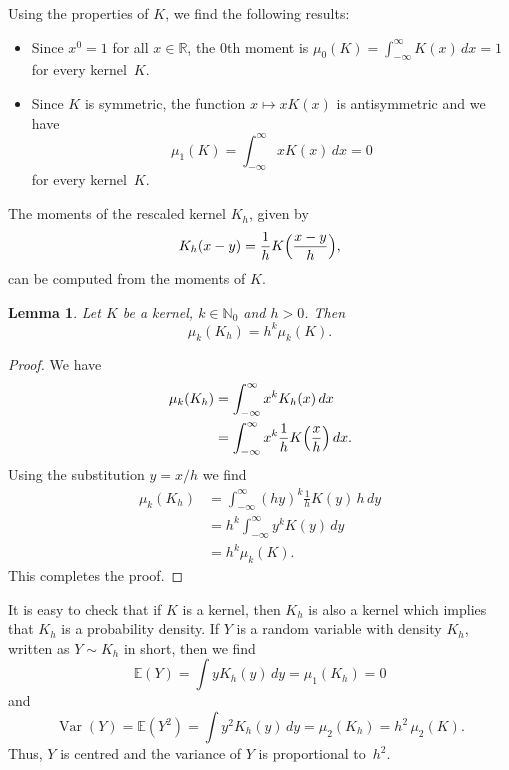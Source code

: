 \documentclass[
  a4paper,
]{article}
\newtheorem{lemma}{Lemma}[section]
\theoremstyle{definition}
\theoremstyle{definition}
\theoremstyle{definition}
\theoremstyle{definition}
\theoremstyle{remark}
\begin{document}
Using the properties of \(K\), we find the following results:

\begin{itemize}
\item
  Since \(x^0 = 1\) for all \(x\in\mathbb{R}\),
  the \(0\)th moment is \(\mu_0(K) = \int_{-\infty}^\infty K(x) \,dx = 1\)
  for every kernel~\(K\).
\item
  Since \(K\) is symmetric, the function \(x \mapsto x K(x)\) is
  antisymmetric and we have
  \begin{equation*}
    \mu_1(K)
    = \int_{-\infty}^\infty x K(x) \,dx
    = 0
  \end{equation*}
  for every kernel~\(K\).
\end{itemize}

The moments of the rescaled kernel \(K_h\), given by
\begin{equation*}
    K_h(x - y)
    = \frac{1}{h} K\Bigl( \frac{x-y}{h} \Bigr),
\end{equation*}
can be computed from the moments of \(K\).

\begin{lemma}
\protect\hypertarget{lem:Kh-scal}{}\label{lem:Kh-scal}Let \(K\) be a kernel, \(k \in \mathbb{N}_0\) and \(h > 0\). Then
\begin{equation*}
  \mu_k(K_h)
  = h^k \mu_k(K).
\end{equation*}
\end{lemma}

\begin{proof}
We have
\begin{align*}
  \mu_k(K_h)
  &= \int_{-\infty}^\infty x^k K_h(x) \,dx \\
  &= \int_{-\infty}^\infty x^k \frac1h K\Bigl(\frac{x}{h}\Bigr) \,dx.
\end{align*}
Using the substitution \(y = x/h\) we find
\begin{align*}
  \mu_k(K_h)
  &= \int_{-\infty}^\infty (hy)^k \frac1h K(y) \, h \,dy \\
  &= h^k \int_{-\infty}^\infty y^k K(y) \,dy \\
  &= h^k \mu_k(K).
\end{align*}
This completes the proof.
\end{proof}

It is easy to check that if \(K\) is a kernel, then \(K_h\) is also a kernel which
implies that \(K_h\) is a probability density. If \(Y\) is a random variable with
density \(K_h\), written as \(Y \sim K_h\) in short, then we find
\begin{equation*}
  \mathbb{E}(Y)
  = \int y K_h(y) \,dy
  = \mu_1(K_h)
  = 0
\end{equation*}
and
\begin{equation}
  \mathop{\mathrm{Var}}(Y)
  = \mathbb{E}(Y^2)
  = \int y^2 K_h(y) \,dy
  = \mu_2(K_h)
  = h^2 \, \mu_2(K).  \label{eq:Kh-var-Y}
\end{equation}
Thus, \(Y\) is centred and the variance of \(Y\) is proportional to~\(h^2\).
\end{document}
